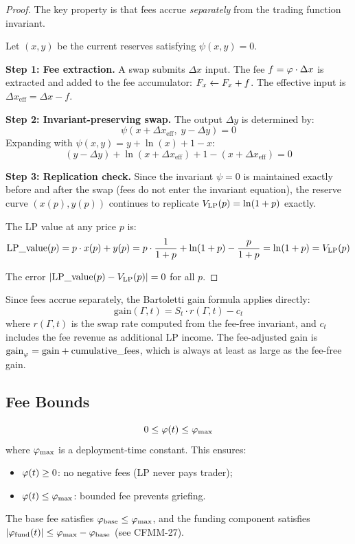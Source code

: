 \begin{proof}
The key property is that fees accrue \emph{separately} from the trading function invariant.

Let $(x, y)$ be the current reserves satisfying $\psi(x, y) = 0$.

\textbf{Step 1: Fee extraction.}
A swap submits $\Delta x$ input. The fee $f = \varphi \cdot \Delta x$ is extracted
and added to the fee accumulator: $F_x \gets F_x + f$.
The effective input is $\Delta x_{\text{eff}} = \Delta x - f$.

\textbf{Step 2: Invariant-preserving swap.}
The output $\Delta y$ is determined by:
\begin{equation}\label{eq:invariant-swap}
  \psi(x + \Delta x_{\text{eff}},\; y - \Delta y) = 0
\end{equation}
Expanding with $\psi(x,y) = y + \ln(x) + 1 - x$:
\[
  (y - \Delta y) + \ln(x + \Delta x_{\text{eff}}) + 1 - (x + \Delta x_{\text{eff}}) = 0
\]

\textbf{Step 3: Replication check.}
Since the invariant $\psi = 0$ is maintained exactly before and after the swap
(fees do not enter the invariant equation), the reserve curve
$(x(p), y(p))$ continues to replicate $V_{\mathrm{LP}}(p) = \ln(1+p)$ exactly.

The LP value at any price $p$ is:
\[
  \text{LP\_value}(p) = p \cdot x(p) + y(p) = p \cdot \frac{1}{1+p} + \ln(1+p) - \frac{p}{1+p} = \ln(1+p) = V_{\mathrm{LP}}(p)
\]

The error $|\text{LP\_value}(p) - V_{\mathrm{LP}}(p)| = 0$ for all $p$. \qedhere
\end{proof}

\begin{remark}
Since fees accrue separately, the Bartoletti gain formula \cite{bartoletti2024formalizing}
applies directly:
\[
  \text{gain}(\Gamma, t) = S_t \cdot r(\Gamma, t) - c_t
\]
where $r(\Gamma, t)$ is the swap rate computed from the fee-free invariant,
and $c_t$ includes the fee revenue as additional LP income. The fee-adjusted gain
is $\text{gain}_\varphi = \text{gain} + \text{cumulative\_fees}$, which is always
at least as large as the fee-free gain.
\end{remark}

\subsection{Fee Bounds}

\begin{equation}\label{eq:fee-bounds}
  0 \leq \varphi(t) \leq \varphi_{\max}
\end{equation}
where $\varphi_{\max}$ is a deployment-time constant. This ensures:
\begin{itemize}
  \item $\varphi(t) \geq 0$: no negative fees (LP never pays trader);
  \item $\varphi(t) \leq \varphi_{\max}$: bounded fee prevents griefing.
\end{itemize}

The base fee satisfies $\varphi_{\text{base}} \leq \varphi_{\max}$, and the funding component
satisfies $|\varphi_{\text{fund}}(t)| \leq \varphi_{\max} - \varphi_{\text{base}}$ (see CFMM-27).
